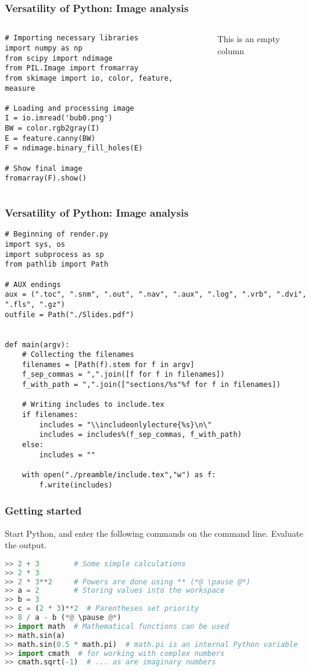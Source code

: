 \begin{frame}[fragile]
\frametitle{Versatility of Python: Image analysis}
\begin{columns}
\begin{lstlisting}
# Importing necessary libraries
import numpy as np
from scipy import ndimage
from PIL.Image import fromarray
from skimage import io, color, feature, measure

# Loading and processing image 
I = io.imread('bub0.png')
BW = color.rgb2gray(I)
E = feature.canny(BW) 
F = ndimage.binary_fill_holes(E)

# Show final image
fromarray(F).show()
\end{lstlisting}  
  \vfill
    This is an empty column
\end{columns}
\end{frame}

\begin{frame}[fragile]
\frametitle{Versatility of Python: Image analysis}
\begin{lstlisting}
# Beginning of render.py
import sys, os
import subprocess as sp
from pathlib import Path 

# AUX endings
aux = (".toc", ".snm", ".out", ".nav", ".aux", ".log", ".vrb", ".dvi", ".fls", ".gz")
outfile = Path("./Slides.pdf")


def main(argv):
    # Collecting the filenames 
    filenames = [Path(f).stem for f in argv]
    f_sep_commas = ",".join([f for f in filenames])
    f_with_path = ",".join(["sections/%s"%f for f in filenames])

    # Writing includes to include.tex
    if filenames:
        includes = "\\includeonlylecture{%s}\n\"
        includes = includes%(f_sep_commas, f_with_path)
    else:
        includes = ""

    with open("./preamble/include.tex","w") as f:
        f.write(includes)
\end{lstlisting}  
\end{frame}

\begin{frame}[fragile]
  \frametitle{Getting started}
   Start Python, and enter the following commands on the command line. Evaluate the output.
   \pause
   \begin{lstlisting}[language=Python,numbers=none]
>> 2 + 3        # Some simple calculations
>> 2 * 3
>> 2 * 3**2     # Powers are done using ** (*@ \pause @*)
>> a = 2        # Storing values into the workspace
>> b = 3
>> c = (2 * 3)**2  # Parentheses set priority
>> 8 / a - b (*@ \pause @*)
>> import math  # Mathematical functions can be used 
>> math.sin(a)  
>> math.sin(0.5 * math.pi)  # math.pi is an internal Python variable
>> import cmath  # for working with complex numbers
>> cmath.sqrt(-1)  # ... as are imaginary numbers    
   \end{lstlisting}
 \end{frame}
 

